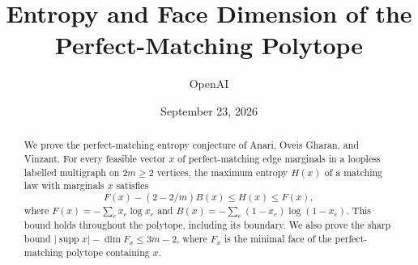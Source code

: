 \documentclass[11pt]{article}
\title{Entropy and Face Dimension of the Perfect-Matching Polytope}
\author{OpenAI}
\date{September 23, 2026}
\DeclareMathOperator{\supp}{supp}
\theoremstyle{remark}
\theoremstyle{definition}
\begin{document}
\maketitle
\begin{abstract}
We prove the perfect-matching entropy conjecture of Anari, Oveis Gharan,
and Vinzant. For every feasible vector $x$ of perfect-matching edge marginals
in a loopless labelled multigraph on $2m\ge2$ vertices, the maximum entropy
$H(x)$ of a matching law with marginals $x$ satisfies
\[
F(x)-(2-2/m)B(x)\le H(x)\le F(x),
\]
where $F(x)=-\sum_e x_e\log x_e$ and
$B(x)=-\sum_e(1-x_e)\log(1-x_e)$.
This bound holds throughout the polytope, including its boundary.
We also prove the sharp bound $|\supp x|-\dim F_x\le3m-2$, where $F_x$ is
the minimal face of the perfect-matching polytope containing $x$.
\end{abstract}










\appendix





\end{document}
